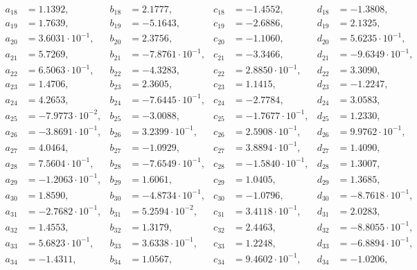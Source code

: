 \begin{align*}
  a_{ 18 } &= 1.1392, & b_{ 18 } &= 2.1777, & c_{ 18 } &= -1.4552, & d_{ 18 } &= -1.3808, \\ 
  a_{ 19 } &= 1.7639, & b_{ 19 } &= -5.1643, & c_{ 19 } &= -2.6886, & d_{ 19 } &= 2.1325, \\ 
  a_{ 20 } &= 3.6031 \cdot 10^{ -1 }, & b_{ 20 } &= 2.3756, & c_{ 20 } &= -1.1060, & d_{ 20 } &= 5.6235 \cdot 10^{ -1 }, \\ 
  a_{ 21 } &= 5.7269, & b_{ 21 } &= -7.8761 \cdot 10^{ -1 }, & c_{ 21 } &= -3.3466, & d_{ 21 } &= -9.6349 \cdot 10^{ -1 }, \\ 
  a_{ 22 } &= 6.5063 \cdot 10^{ -1 }, & b_{ 22 } &= -4.3283, & c_{ 22 } &= 2.8850 \cdot 10^{ -1 }, & d_{ 22 } &= 3.3090, \\ 
  a_{ 23 } &= 1.4706, & b_{ 23 } &= 2.3605, & c_{ 23 } &= 1.1415, & d_{ 23 } &= -1.2247, \\ 
  a_{ 24 } &= 4.2653, & b_{ 24 } &= -7.6445 \cdot 10^{ -1 }, & c_{ 24 } &= -2.7784, & d_{ 24 } &= 3.0583, \\ 
  a_{ 25 } &= -7.9773 \cdot 10^{ -2 }, & b_{ 25 } &= -3.0088, & c_{ 25 } &= -1.7677 \cdot 10^{ -1 }, & d_{ 25 } &= 1.2330, \\ 
  a_{ 26 } &= -3.8691 \cdot 10^{ -1 }, & b_{ 26 } &= 3.2399 \cdot 10^{ -1 }, & c_{ 26 } &= 2.5908 \cdot 10^{ -1 }, & d_{ 26 } &= 9.9762 \cdot 10^{ -1 }, \\ 
  a_{ 27 } &= 4.0464, & b_{ 27 } &= -1.0929, & c_{ 27 } &= 3.8894 \cdot 10^{ -1 }, & d_{ 27 } &= 1.4090, \\ 
  a_{ 28 } &= 7.5604 \cdot 10^{ -1 }, & b_{ 28 } &= -7.6549 \cdot 10^{ -1 }, & c_{ 28 } &= -1.5840 \cdot 10^{ -1 }, & d_{ 28 } &= 1.3007, \\ 
  a_{ 29 } &= -1.2063 \cdot 10^{ -1 }, & b_{ 29 } &= 1.6061, & c_{ 29 } &= 1.0405, & d_{ 29 } &= 1.3685, \\ 
  a_{ 30 } &= 1.8590, & b_{ 30 } &= -4.8734 \cdot 10^{ -1 }, & c_{ 30 } &= -1.0796, & d_{ 30 } &= -8.7618 \cdot 10^{ -1 }, \\ 
  a_{ 31 } &= -2.7682 \cdot 10^{ -1 }, & b_{ 31 } &= 5.2594 \cdot 10^{ -2 }, & c_{ 31 } &= 3.4118 \cdot 10^{ -1 }, & d_{ 31 } &= 2.0283, \\ 
  a_{ 32 } &= 1.4553, & b_{ 32 } &= 1.3179, & c_{ 32 } &= 2.4463, & d_{ 32 } &= -8.8055 \cdot 10^{ -1 }, \\ 
  a_{ 33 } &= 5.6823 \cdot 10^{ -1 }, & b_{ 33 } &= 3.6338 \cdot 10^{ -1 }, & c_{ 33 } &= 1.2248, & d_{ 33 } &= -6.8894 \cdot 10^{ -1 }, \\ 
  a_{ 34 } &= -1.4311, & b_{ 34 } &= 1.0567, & c_{ 34 } &= 9.4602 \cdot 10^{ -1 }, & d_{ 34 } &= -1.0206, \\ 

\end{align*}
